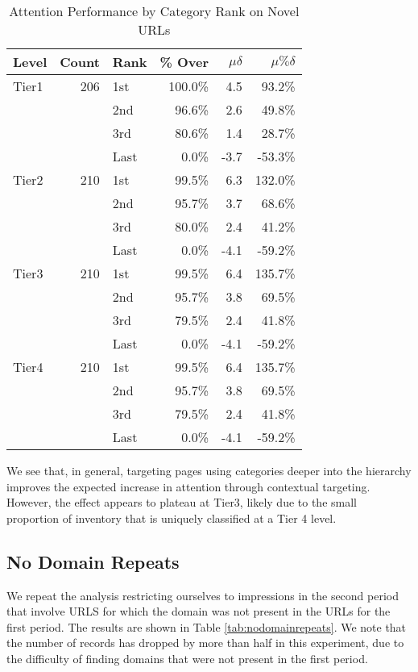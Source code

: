 \documentclass[sigconf]{acmart}
\begin{document}
\begin{table}
\caption{Attention Performance by Category Rank on Novel URLs}
\label{tab:nourlrepeats}
\begin{tabular}{|l|r|l|r|r|r|}
\toprule
Level   &Count    &Rank &\% Over  &$\mu\delta$  &$\mu\%\delta$        \\
\midrule
Tier1   &206      &1st  &100.0\%    &4.5         &93.2\%     \\
        &         &2nd  &96.6\%     &2.6         &49.8\%     \\
        &         &3rd  &80.6\%     &1.4         &28.7\%     \\
        &         &Last &0.0\%      &-3.7        &-53.3\%     \\
Tier2   &210      &1st  &99.5\%     &6.3         &132.0\%     \\
        &         &2nd  &95.7\%     &3.7         &68.6\%     \\
        &         &3rd  &80.0\%     &2.4         &41.2\%     \\
        &         &Last &0.0\%      &-4.1        &-59.2\%     \\
Tier3   &210      &1st  &99.5\%     &6.4         &135.7\%     \\
        &         &2nd  &95.7\%     &3.8         &69.5\%     \\
        &         &3rd  &79.5\%     &2.4         &41.8\%     \\
        &         &Last &0.0\%      &-4.1        &-59.2\%     \\
Tier4   &210      &1st  &99.5\%     &6.4         &135.7\%     \\
        &         &2nd  &95.7\%     &3.8         &69.5\%     \\
        &         &3rd  &79.5\%     &2.4         &41.8\%     \\
        &         &Last &0.0\%      &-4.1        &-59.2\%     \\
\bottomrule
\end{tabular}
\end{table}

We see that, in general, targeting pages using categories deeper into the hierarchy
improves the expected increase in attention through contextual targeting.
However, the effect appears to plateau at Tier3, likely due to the small proportion of inventory
that is uniquely classified at a Tier 4 level.

\subsection{No Domain Repeats}
We repeat the analysis restricting ourselves to impressions in the second period
that involve URLS for which the domain was not present in the URLs for the first period.
The results are shown in Table \ref{tab:nodomainrepeats}.
We note that the number of records has dropped by
more than half in this experiment, due to the difficulty of finding domains that were
not present in the first period.
\end{document}
